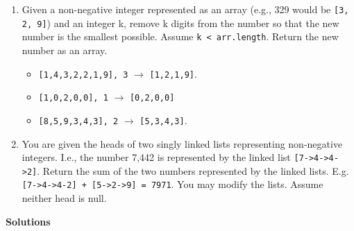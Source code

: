 \documentclass{article}
\begin{document}
\begin{enumerate}
\begin{itemize}
\end{itemize}

\item Given a non-negative integer represented as an array (e.g., 329 would be \texttt{[3, 2, 9]}) and an integer k, remove k digits from the number so that the new number is the smallest possible. Assume \texttt{k < arr.length}. Return the new number as an array.
 
 
\begin{itemize}

\item \texttt{[1,4,3,2,2,1,9], 3} $\rightarrow$ \texttt{[1,2,1,9]}.
\item \texttt{[1,0,2,0,0], 1} $\rightarrow$ \texttt{[0,2,0,0]}
\item \texttt{[8,5,9,3,4,3], 2} $\rightarrow$ \texttt{[5,3,4,3]}.

\end{itemize}

\item You are given the heads of two singly linked lists representing non-negative integers. I.e., the number 7,442 is represented by the linked list \texttt{[7->4->4->2]}. Return the sum of the two numbers represented by the linked lists. E.g. \texttt{[7->4->4-2] + [5->2->9] = 7971}. You may modify the lists. Assume neither head is null.  %

\end{enumerate}

\clearpage


\begin{center}
    \textbf{Solutions}
\end{center}
\end{document}
